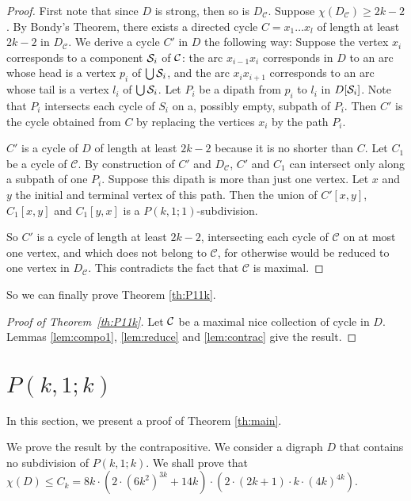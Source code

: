 \documentclass[utf8,10pt]{article}
\theoremstyle{plain}
\theoremstyle{definition}
\theoremstyle{remark}
\newcommand{\cste}{ 8k \cdot (2\cdot \col + 14k) \cdot (2 \cdot \dr)}
\newcommand{\dr}{ (2k+1)\cdot k \cdot (4k)^{4k}}
\newcommand{\col}{(6k^2)^{3k}}
\begin{document}
\begin{proof}
First note that since $D$ is strong, then so is $D_{\mathcal{C}}$. Suppose $\chi(D_{\mathcal{C}}) \geq 2k-2$. By Bondy's Theorem, there exists a directed cycle
$C = x_1\dots x_l$ of length at least $2k-2$ in $ D_{\mathcal{C}}$. We derive a cycle $C'$ in $D$ the following way:
Suppose the vertex $x_i$ corresponds to a component ${\cal S}_i$ of ${\cal C}$: the arc $x_{i-1}x_i$ corresponds in $D$ to an arc whose head
is a vertex $p_i$ of $\bigcup {\cal S}_i$, and the arc $x_ix_{i+1}$ corresponds to an arc whose tail is a vertex  $l_i$ of $\bigcup {\cal S}_i$. 
Let $P_i$ be a dipath 
from $p_i$ to $l_i$ in $D[{\cal S}_i]$. Note that $P_i$ intersects each cycle of $S_i$ on a, possibly empty, subpath of $P_i$. 
Then $C'$ is the cycle obtained from $C$ by replacing the vertices $x_i$ by the path $P_i$.

$C'$ is a cycle of $D$ of length at least $2k-2$ because it is no shorter than $C$. Let $C_1$ be a cycle of $\mathcal{C}$. By construction of $C'$ 
and $D_{\mathcal{C}}$, $C'$ and $C_1$ can intersect only along a subpath of one $P_i$. Suppose this dipath is more than just one vertex. Let $x$ and
$y$ the initial and terminal vertex of this path. Then the union of $C'[x,y]$,
$C_1[x,y]$ and $C_1[y,x]$ is a $P(k,1;1)$-subdivision.

So $C'$ is a cycle of length at least $2k-2$, intersecting each cycle of $\mathcal{C}$ on at most one vertex, and which does not belong to $\mathcal{C}$, for otherwise would be reduced
to one vertex in $D_{\mathcal{C}}$. This contradicts the fact that $\mathcal{C}$ is maximal.
\end{proof}

So we can finally prove Theorem \ref{th:P11k}.

\begin{proof}[Proof of Theorem~\ref{th:P11k}]
Let ${\cal C}$ be a maximal nice collection of cycle in $D$.  Lemmas \ref{lem:compo1}, \ref{lem:reduce} and \ref{lem:contrac} give the result.
\end{proof}


\section{$P(k,1;k)$}\label{sec:main}

In this section, we present a proof of Theorem \ref{th:main}.

We prove the result by the contrapositive. We consider a digraph $D$ that contains no subdivision of $P(k,1;k)$.
We shall prove that $\chi(D) \leq  C_k= \cste$.
\end{document}

